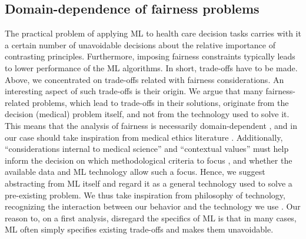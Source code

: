 \subsection{Domain-dependence of fairness problems}
    The practical problem of applying ML to health care decision tasks carries with it a certain number of unavoidable decisions about the relative importance of contrasting principles.
    Furthermore, imposing fairness constraints typically leads to lower performance of the ML algorithms.
    In short, trade-offs have to be made.
    Above, we concentrated on trade-offs related with fairness considerations.
    An interesting aspect of such trade-offs is their origin.
    We argue that many fairness-related problems, which lead to trade-offs in their solutions, originate from the decision (medical) problem itself, and not from the technology used to solve it.
    This means that the analysis of fairness is necessarily domain-dependent \cite{Fletcher2021}, and in our case should take inspiration from medical ethics literature \cite{Morley2020}.
    Additionally, ``considerations internal to medical science'' and ``contextual values'' must help inform the decision on which methodological criteria to focus \cite[p.~252]{Ho2011}, and whether the available data and ML technology allow such a focus.
    Hence, we suggest abstracting from ML itself and regard it as a general technology used to solve a pre-existing problem.
    We thus take inspiration from philosophy of technology, recognizing the interaction between our behavior and the technology we use \cite{Dijkstra2020}.
    Our reason to, on a first analysis, disregard the specifics of ML is that in many cases, ML often simply specifies existing trade-offs and makes them unavoidable.

